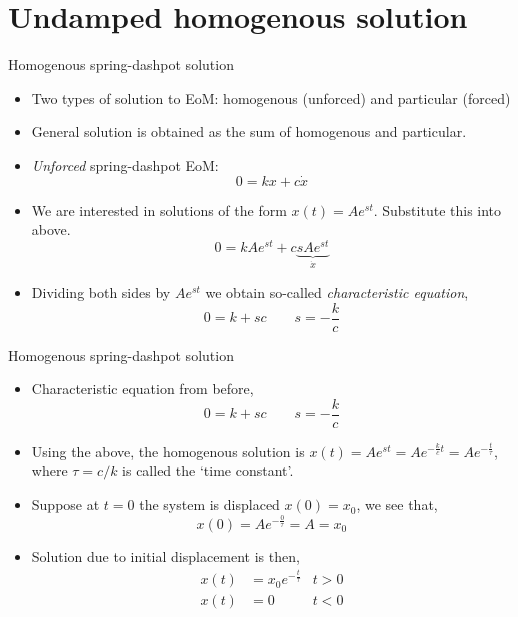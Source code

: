 \documentclass[11pt,aspectratio=169,handout]{beamer}
\begin{document}
\section{Undamped homogenous solution}
\begin{frame}[c]{Homogenous spring-dashpot solution}
	\begin{itemize}
		\item<1-> Two types of solution to EoM: homogenous (unforced) and particular (forced)
		\item<2-> General solution is obtained as the sum of homogenous and particular.
		\item<3-> \textit{Unforced} spring-dashpot EoM:
		\begin{equation}\label{}
			0 = kx + c\dot{x}
		\end{equation}
		\item<4-> We are interested in solutions of the form $x(t) = Ae^{st}$. Substitute this  into above.
		\begin{equation}\label{}
			0 = kAe^{st} + c \underbrace{sAe^{st}}_{\dot{x}}
		\end{equation}
	\item<5-> Dividing both sides by $Ae^{st}$ we obtain so-called \textit{characteristic equation},
	\begin{equation}
		0 = k + sc \quad \quad s = -\frac{k}{c}
	\end{equation}
	\end{itemize}
\end{frame}

\begin{frame}[c]{Homogenous spring-dashpot solution}
	\begin{itemize}
		\item<1-> Characteristic equation from before,
		\begin{equation}
			0 = k + sc \quad \quad s = -\frac{k}{c}
		\end{equation}
		\item<2-> Using the above, the homogenous solution is $x(t) = Ae^{st} = Ae^{-\frac{k}{c}t}=Ae^{-\frac{t}{\tau}}$, where $\tau=c/k$ is called the `time constant'.
		\item<3-> Suppose at $t=0$ the system is displaced $x(0) = x_0$, we see that,
		\begin{equation}
			x(0) = Ae^{-\frac{0}{\tau}} = A = x_0
		\end{equation}
	\item<4-> Solution due to initial displacement is then, 
	\begin{align}
		x(t) &= x_0 e^{-\frac{t}{\tau}}   & t>0  \\
		x(t) &= 0  & t<0  
	\end{align}
	\end{itemize}
\end{frame}
\end{document}
